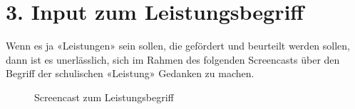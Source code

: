 \documentclass[
  10pt,
  a4paper,
  DIV=11]{scrartcl}
\begin{document}
\section{3. Input zum
Leistungsbegriff}\label{input-zum-leistungsbegriff}

Wenn es ja «Leistungen» sein sollen, die gefördert und beurteilt werden
sollen, dann ist es unerlässlich, sich im Rahmen des folgenden
Screencasts über den Begriff der schulischen «Leistung» Gedanken zu
machen.

\begin{figure}

\centering{

}

\caption{\label{fig-Leistung}Screencast zum Leistungsbegriff}

\end{figure}%
\end{document}
